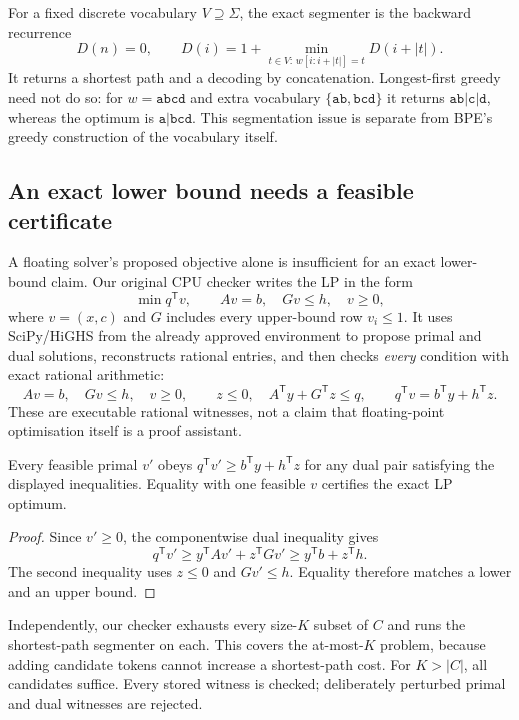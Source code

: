 For a fixed discrete vocabulary $V\supseteq\Sigma$, the exact segmenter is
the backward recurrence
\[
 D(n)=0,\qquad
 D(i)=1+\min_{t\in V:\,w[i:i+|t|]=t}D(i+|t|).
\]
It returns a shortest path and a decoding by concatenation. Longest-first
greedy need not do so: for $w=\mathtt{abcd}$ and extra vocabulary
$\{\mathtt{ab},\mathtt{bcd}\}$ it returns
$\mathtt{ab}|\mathtt c|\mathtt d$, whereas the optimum is
$\mathtt a|\mathtt{bcd}$. This segmentation issue is separate from BPE's
greedy construction of the vocabulary itself.

\subsection{An exact lower bound needs a feasible certificate}
A floating solver's proposed objective alone is insufficient for an
exact lower-bound claim. Our original CPU checker writes the LP in the
form
\[
 \min q^{\mathsf T}v,\qquad Av=b,\quad Gv\le h,\quad v\ge0,
\]
where $v=(x,c)$ and $G$ includes every upper-bound row $v_i\le1$.
It uses SciPy/HiGHS from the already approved environment to propose
primal and dual solutions, reconstructs rational entries, and then checks
\emph{every} condition with exact rational arithmetic:
\[
 Av=b,\quad Gv\le h,\quad v\ge0,\qquad
 z\le0,\quad A^{\mathsf T}y+G^{\mathsf T}z\le q,
 \qquad q^{\mathsf T}v=b^{\mathsf T}y+h^{\mathsf T}z.
\]
These are executable rational witnesses, not a claim that floating-point
optimisation itself is a proof assistant.
\begin{proposition}
Every feasible primal $v'$ obeys
$q^{\mathsf T}v'\ge b^{\mathsf T}y+h^{\mathsf T}z$ for any dual pair
satisfying the displayed inequalities. Equality with one feasible $v$
certifies the exact LP optimum.
\end{proposition}
\begin{proof}
Since $v'\ge0$, the componentwise dual inequality gives
\[
 q^{\mathsf T}v'\ge y^{\mathsf T}Av'+z^{\mathsf T}Gv'
 \ge y^{\mathsf T}b+z^{\mathsf T}h.
\]
The second inequality uses $z\le0$ and $Gv'\le h$. Equality therefore
matches a lower and an upper bound.
\end{proof}
Independently, our checker exhausts every size-$K$ subset of $C$ and runs
the shortest-path segmenter on each. This covers the at-most-$K$ problem,
because adding candidate tokens cannot increase a shortest-path cost.
For $K>|C|$, all candidates suffice. Every stored witness is checked;
deliberately perturbed primal and dual witnesses are rejected.

